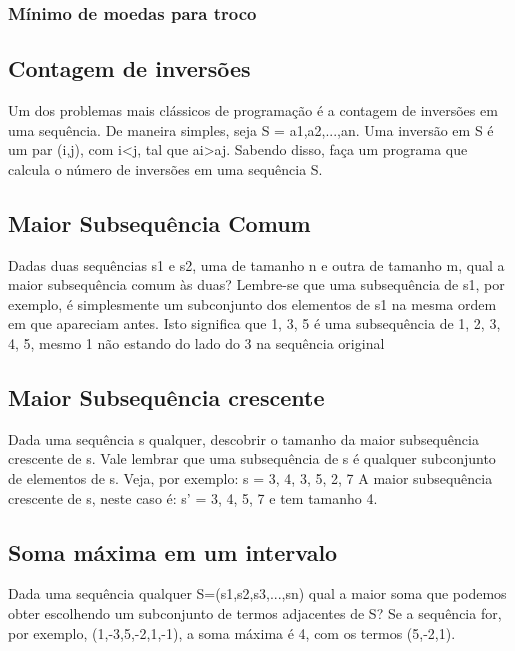 \documentclass[a4paper,12pt]{article}
\begin{document}
\subsubsection{Mínimo de moedas para troco}

\subsection{Contagem de inversões}

\indent Um dos problemas mais clássicos de programação é a contagem de inversões em uma sequência. De maneira simples, seja S = a1,a2,...,an. Uma inversão em S é um par (i,j), com i<j, tal que ai>aj. Sabendo disso, faça um programa que calcula o número de inversões em uma sequência S.


\subsection{Maior Subsequência Comum}

\indent Dadas duas sequências s1 e s2, uma de tamanho n e outra de tamanho m, qual a maior subsequência comum às duas? Lembre-se que uma subsequência de s1, por exemplo, é simplesmente um subconjunto dos elementos de s1 na mesma ordem em que apareciam antes. Isto significa que {1, 3, 5} é uma subsequência de {1, 2, 3, 4, 5}, mesmo 1 não estando do lado do 3 na sequência original


\subsection{Maior Subsequência crescente}
Dada uma sequência s qualquer, descobrir o tamanho da maior subsequência crescente de s. Vale lembrar que uma subsequência de s é qualquer subconjunto de elementos de s. Veja, por exemplo:
s = {3, 4, 3, 5, 2, 7}
A maior subsequência crescente de s, neste caso é:
s' = {3, 4, 5, 7}
e tem tamanho 4.


\subsection{Soma máxima em um intervalo}
\indent Dada uma sequência qualquer S=(s1,s2,s3,...,sn) qual a maior soma que podemos obter escolhendo um subconjunto de termos adjacentes de S? Se a sequência for, por exemplo, (1,-3,5,-2,1,-1), a soma máxima é 4, com os termos (5,-2,1).
\end{document}
